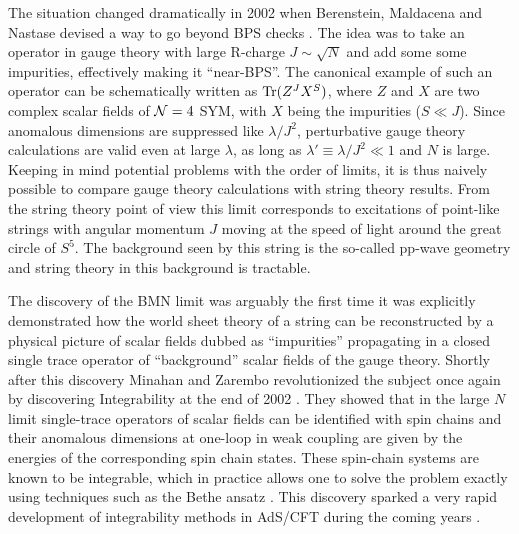The situation changed dramatically in 2002 when Berenstein, Maldacena and Nastase devised a way to go beyond BPS checks \cite{Berenstein:2002jq}. 
The idea was to take an operator in gauge theory with large R-charge $J \sim \sqrt{N}$ and add some some impurities, effectively making it ``near-BPS''.
The canonical example of such an operator can be schematically written as $\mathrm{Tr}(Z^J X^S)$, where $Z$ and $X$ are two complex scalar fields of $\mathcal{N}=4$ SYM, with $X$ being the impurities ($S \ll J$).
Since anomalous dimensions are suppressed like $\lambda/J^2$, perturbative gauge theory calculations are valid even at large $\lambda$, as long as $\lambda' \equiv \lambda / J^2 \ll 1$ and $N$ is large.
Keeping in mind potential problems with the order of limits, it is thus naively possible to compare gauge theory calculations with string theory results.
From the string theory point of view this limit corresponds to excitations of point-like strings with angular momentum $J$ moving at the speed of light around the great circle of $S^5$. 
The background seen by this string is the so-called pp-wave geometry and string theory in this background is tractable.

The discovery of the BMN limit was arguably the first time it was explicitly demonstrated how the world sheet theory of a string can be reconstructed by a physical picture of scalar fields dubbed as ``impurities'' propagating in a closed single trace operator of ``background'' scalar fields of the gauge theory. 
Shortly after this discovery Minahan and Zarembo revolutionized the subject once again by discovering Integrability at the end of 2002 \cite{Minahan:2002ve}.
They showed that in the large $N$ limit single-trace operators of scalar fields can be identified with spin chains and their anomalous dimensions at one-loop in weak coupling are given by the energies of the corresponding spin chain states.
These spin-chain systems are known to be integrable, which in practice allows one to solve the problem exactly using techniques such as the Bethe ansatz \cite{Bethe:1931}. 
This discovery sparked a very rapid development of integrability methods in AdS/CFT during the coming years \cite{Beisert:2010jr}.

